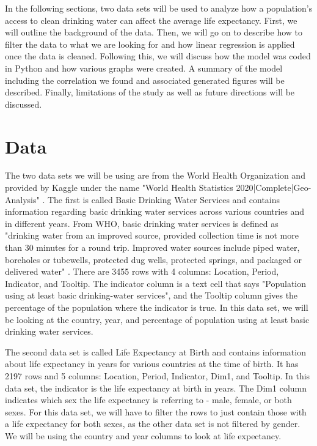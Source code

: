\documentclass[12pt]{article}
\begin{document}
In the following sections, two data sets will be used to analyze how a population's access to clean drinking water can affect the average life expectancy. First, we will outline the background of the data. Then, we will go on to describe how to filter the data to what we are looking for and how linear regression is applied once the data is cleaned. Following this, we will discuss how the model was coded in Python and how various graphs were created. A summary of the model including the correlation we found and associated generated figures will be described. Finally, limitations of the study as well as future directions will be discussed.

\section{Data}

The two data sets we will be using are from the World Health Organization and provided by Kaggle under the name "World Health Statistics 2020|Complete|Geo-Analysis" \citep{dataset}. The first is called Basic Drinking Water Services and contains information regarding basic drinking water services across various countries and in different years. From WHO, basic drinking water services is defined as "drinking water from an improved source, provided collection time is not more than 30 minutes for a round trip. Improved water sources include piped water, boreholes or tubewells, protected dug wells, protected springs, and packaged or delivered water" \citep{twd2022glossary}. There are 3455 rows with 4 columns: Location, Period, Indicator, and Tooltip. The indicator column is a text cell that says "Population using at least basic drinking-water services", and the Tooltip column gives the percentage of the population where the indicator is true. In this data set, we will be looking at the country, year, and percentage of population using at least basic drinking water services.
  
The second data set is called Life Expectancy at Birth and contains information about life expectancy in years for various countries at the time of birth. It has 2197 rows and 5 columns: Location, Period, Indicator, Dim1, and Tooltip. In this data set, the indicator is the life expectancy at birth in years. The Dim1 column indicates which sex the life expectancy is referring to - male, female, or both sexes. For this data set, we will have to filter the rows to just contain those with a life expectancy for both sexes, as the other data set is not filtered by gender. We will be using the country and year columns to look at life expectancy.
\end{document}

